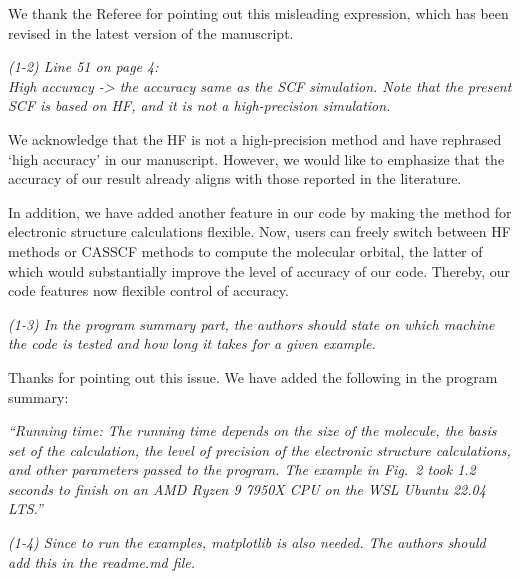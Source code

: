 \documentclass[a4paper,11pt]{article}
\begin{document}
\vspace{1em}

We thank the Referee for pointing out this misleading expression, which has been revised in the latest version of the manuscript.

\vspace{2em}


\noindent\textit{
(1-2) Line 51 on page 4: \\
High accuracy -> the accuracy same as the SCF simulation.
Note that the present SCF is based on HF, and it is not a high-precision simulation.
}

\vspace{1em}

We acknowledge that the HF is not a high-precision method and have rephrased `high accuracy' in our manuscript.
However, we would like to emphasize that the accuracy of our result already aligns with those reported in the literature.

In addition, we have added another feature in our code by making the method for electronic structure calculations flexible.
Now, users can freely switch between HF methods or CASSCF methods to compute the molecular orbital, the latter of which would substantially improve the level of accuracy of our code.
Thereby, our code features now flexible control of accuracy.

\vspace{2em}


\noindent\textit{
(1-3) In the program summary part, the authors should state on which machine the code is tested and how long it takes for a given example.
}

\vspace{1em}

Thanks for pointing out this issue.
We have added the following in the program summary:

{\em ``Running time: The running time depends on the size of the molecule, the basis set of the calculation, the level of precision of the electronic structure calculations, and other parameters passed to the program. The example in Fig.~2 took 1.2 seconds to finish on an AMD Ryzen 9 7950X CPU on the WSL Ubuntu 22.04 LTS.''}

\vspace{2em}


\noindent\textit{
(1-4) Since to run the examples, matplotlib is also needed. The authors should add this in the readme.md file.
}
\end{document}
